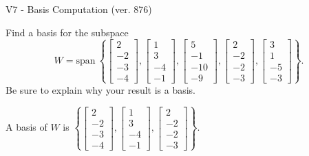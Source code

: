 \begin{exercise}
  \begin{exerciseTitle}V7 - Basis Computation (ver. 876)\end{exerciseTitle}
  \begin{exerciseStatement}
    Find a basis for the subspace 
\[W=\mathrm{span}\ \left\{\left[\begin{array}{r}
2 \\
-2 \\
-3 \\
-4
\end{array}\right] , \left[\begin{array}{r}
1 \\
3 \\
-4 \\
-1
\end{array}\right] , \left[\begin{array}{r}
5 \\
-1 \\
-10 \\
-9
\end{array}\right] , \left[\begin{array}{r}
2 \\
-2 \\
-2 \\
-3
\end{array}\right] , \left[\begin{array}{r}
3 \\
1 \\
-5 \\
-3
\end{array}\right]\right\}.\]
 Be sure to explain why your result is a basis.


  \end{exerciseStatement}
  \begin{exerciseAnswer}
   A basis of \(W\) is  \(\left\{\left[\begin{array}{r}
2 \\
-2 \\
-3 \\
-4
\end{array}\right] , \left[\begin{array}{r}
1 \\
3 \\
-4 \\
-1
\end{array}\right] , \left[\begin{array}{r}
2 \\
-2 \\
-2 \\
-3
\end{array}\right]\right\}\).
  


  \end{exerciseAnswer}
\end{exercise}